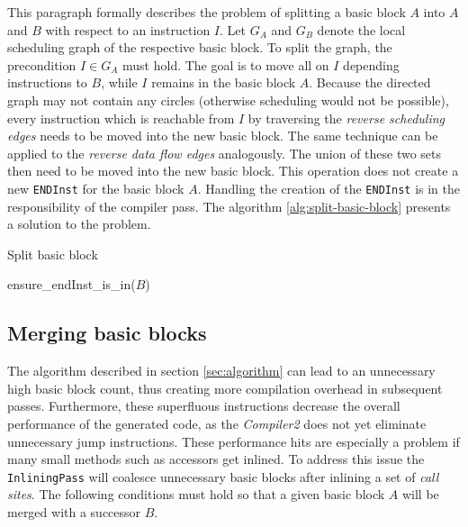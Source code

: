 \documentclass[draft, final]{vutinfth} %
\begin{document}
This paragraph formally describes the problem of splitting a basic block $A$ into $A$ and $B$ with respect to an instruction $I$. Let $G_A$ and $G_B$ denote the local scheduling graph of the respective basic block. To split the graph, the precondition $I \in G_A$ must hold. The goal is to move all on $I$ depending instructions to $B$, while $I$ remains in the basic block $A$. Because the directed graph may not contain any circles (otherwise scheduling would not be possible), every instruction which is reachable from $I$ by traversing the \emph{reverse scheduling edges} needs to be moved into the new basic block. The same technique can be applied to the \emph{reverse data flow edges} analogously. The union of these two sets then need to be moved into the new basic block. This operation does not create a new \texttt{ENDInst} for the basic block $A$. Handling the creation of the \texttt{ENDInst} is in the responsibility of the compiler pass. The algorithm \ref{alg:split-basic-block} presents a solution to the problem. 

\begin{algorithm}[H]
\caption{Split basic block}
\label{alg:split-basic-block}

ensure\_endInst\_is\_in($B$)


\end{algorithm}


\subsection{Merging basic blocks}
\label{sec:merge-basic-blocks}

The algorithm described in section \ref{sec:algorithm} can lead to an unnecessary high basic block count, thus creating more compilation overhead in subsequent passes. Furthermore, these superfluous instructions decrease the overall performance of the generated code, as the \emph{Compiler2} does not yet eliminate unnecessary jump instructions. These performance hits are especially a problem if many small methods such as accessors get inlined. To address this issue the \texttt{InliningPass} will coalesce unnecessary basic blocks after inlining a set of \emph{call sites}. The following conditions must hold so that a given basic block $A$ will be merged with a successor $B$.
\end{document}
